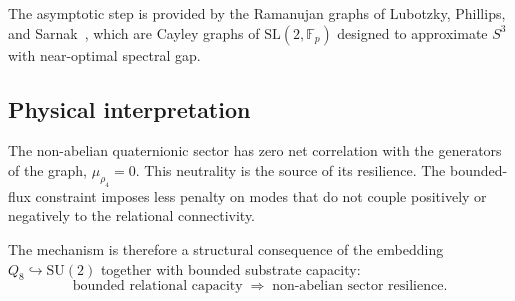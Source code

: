    The asymptotic step is provided by the Ramanujan graphs of
    Lubotzky, Phillips, and Sarnak~\cite{LPS1988}, which are Cayley graphs of
    $\mathrm{SL}(2,\mathbb{F}_p)$ designed to approximate $S^3$ with near-optimal
    spectral gap.

  \subsection{Physical interpretation}
    \label{sec:step4-physics}

    The non-abelian quaternionic sector has zero net correlation with the
    generators of the graph, $\mu_{\rho_4} = 0$.
    This neutrality is the source of its resilience.
    The bounded-flux constraint imposes less penalty on modes that do not couple
    positively or negatively to the relational connectivity.

    The mechanism is therefore a structural consequence of the embedding
    $Q_8 \hookrightarrow \mathrm{SU}(2)$ together with bounded substrate capacity:
    \begin{equation}
      \text{bounded relational capacity}
      \;\Longrightarrow\;
      \text{non-abelian sector resilience}.
    \end{equation}
